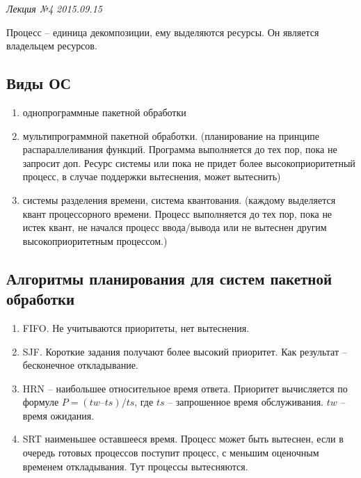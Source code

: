 \clearpage
\begin{flushright}
	\textit{Лекция №4}
	\textit{2015.09.15}
\end{flushright}

Процесс – единица декомпозиции, ему выделяются ресурсы. Он является владельцем ресурсов. 

\subsection{Виды ОС}
\begin{enumerate}
    \item однопрограммные пакетной обработки
    \item мультипрограммной пакетной обработки. (планирование на принципе распараллеливания функций. Программа выполняется до тех пор, пока не запросит доп. Ресурс системы или пока не придет более высокоприоритетный процесс, в случае поддержки вытеснения, может вытеснить)
    \item системы разделения времени, система квантования. (каждому выделяется квант процессорного времени. Процесс выполняется до тех пор, пока не истек квант, не начался процесс ввода/вывода или не вытеснен другим высокоприоритетным процессом.)
\end{enumerate}


\subsection{Алгоритмы планирования для систем пакетной обработки}
\begin{enumerate}
    \item FIFO. Не учитываются приоритеты, нет вытеснения.
    \item SJF. Короткие задания получают более высокий приоритет. Как результат – бесконечное откладывание. 
    \item HRN – наибольшее относительное время ответа. Приоритет вычисляется по формуле $P = (tw – ts) / ts$, где $ts$ – запрошенное время обслуживания. $tw$ – время ожидания.
    \item SRT наименьшее оставшееся время. Процесс может быть вытеснен, если в очередь готовых процессов поступит процесс, с меньшим оценочным временем откладывания. Тут процессы вытесняются.
\end{enumerate}

